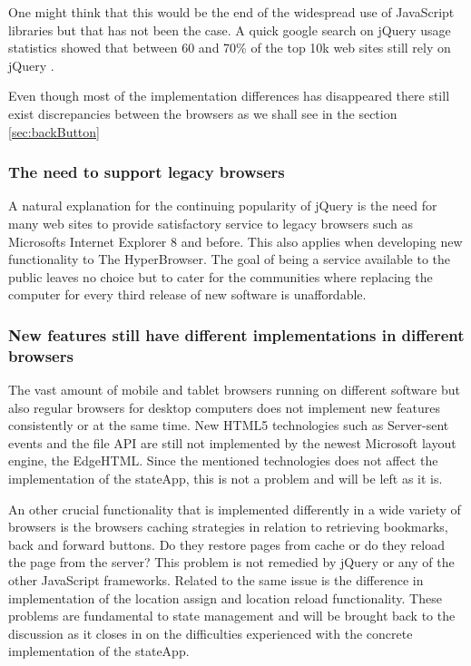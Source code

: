 \documentclass[english]{ifimaster}
\begin{document}
One might think that this would be the end of the widespread use of JavaScript libraries but that has not been the case. A quick google search on jQuery usage statistics showed that between 60 and 70\% of the top 10k web sites still rely on jQuery \parencite{jQueryWiki} \parencite{jQueryW3Tech}\parencite{builtWith}. 

Even though most of the implementation differences has disappeared there still exist discrepancies between the browsers as we shall see in the section \ref{sec:backButton} 

\subsubsection{The need to support legacy browsers}
A natural explanation for the continuing popularity of jQuery is the need for many web sites to provide satisfactory service to legacy browsers such as Microsofts Internet Explorer 8 and before. This also applies when developing new functionality to The HyperBrowser. The goal of being a service available to the public leaves no choice but to cater for the communities where replacing the computer for every third release of new software is unaffordable. 



\subsubsection{New features still have different implementations in different browsers}
The vast amount of mobile and tablet browsers running on different software but also regular browsers for desktop computers does not implement new features consistently or at the same time. New HTML5 technologies such as Server-sent events and the file API are still not implemented by the newest Microsoft layout engine, the EdgeHTML\parencite{comparison_of_layout_engines}. Since the mentioned technologies does not affect the implementation of the stateApp, this is not a problem and will be left as it is.

An other crucial functionality that is implemented differently in a wide variety of browsers is the browsers caching strategies in relation to retrieving bookmarks, back and forward buttons. Do they restore pages from cache or do they reload the page from the server? This problem is not remedied by jQuery or any of the other JavaScript frameworks. Related to the same issue is the difference in implementation of the location assign and location reload functionality. These problems are fundamental to state management and will be brought back to the discussion as it closes in on the difficulties experienced with the concrete implementation of the stateApp. 
\end{document}
